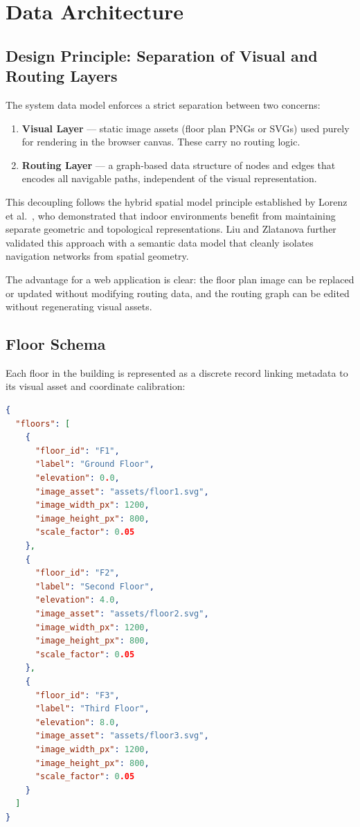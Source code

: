 \section{Data Architecture}
\label{sec:data-architecture}

\subsection{Design Principle: Separation of Visual and Routing Layers}

The system data model enforces a strict separation between two concerns:

\begin{enumerate}
  \item \textbf{Visual Layer} --- static image assets (floor plan PNGs or SVGs) used purely for rendering in the browser canvas. These carry no routing logic.
  \item \textbf{Routing Layer} --- a graph-based data structure of nodes and edges that encodes all navigable paths, independent of the visual representation.
\end{enumerate}

This decoupling follows the hybrid spatial model principle established by Lorenz et al.\ \cite{Lorenz2006}, who demonstrated that indoor environments benefit from maintaining separate geometric and topological representations. Liu and Zlatanova \cite{Liu2012} further validated this approach with a semantic data model that cleanly isolates navigation networks from spatial geometry.

The advantage for a web application is clear: the floor plan image can be replaced or updated without modifying routing data, and the routing graph can be edited without regenerating visual assets.

\subsection{Floor Schema}

Each floor in the building is represented as a discrete record linking metadata to its visual asset and coordinate calibration:

\begin{lstlisting}[language=json, caption={Floor data structure}]
{
  "floors": [
    {
      "floor_id": "F1",
      "label": "Ground Floor",
      "elevation": 0.0,
      "image_asset": "assets/floor1.svg",
      "image_width_px": 1200,
      "image_height_px": 800,
      "scale_factor": 0.05
    },
    {
      "floor_id": "F2",
      "label": "Second Floor",
      "elevation": 4.0,
      "image_asset": "assets/floor2.svg",
      "image_width_px": 1200,
      "image_height_px": 800,
      "scale_factor": 0.05
    },
    {
      "floor_id": "F3",
      "label": "Third Floor",
      "elevation": 8.0,
      "image_asset": "assets/floor3.svg",
      "image_width_px": 1200,
      "image_height_px": 800,
      "scale_factor": 0.05
    }
  ]
}
\end{lstlisting}

